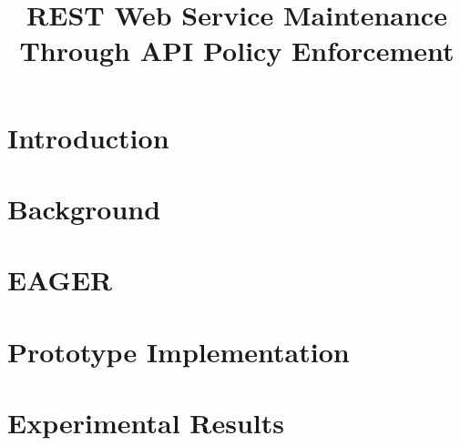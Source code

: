 \documentclass[journal]{IEEEtran}
\begin{document}
\title{REST Web Service Maintenance Through API Policy Enforcement}

\author{
}\maketitle

\begin{abstract}

\end{abstract}




\section{Introduction}
\label{sec:intro}


\section{Background}
\label{sec:bg}


\section{EAGER}
\label{sec:eager}


\section{Prototype Implementation}
\label{sec:prototype_impl}


\section{Experimental Results}
\label{sec:results}

\end{document}
